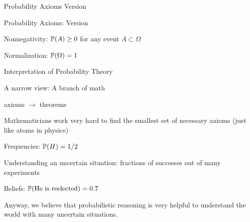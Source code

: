 \begin{frame}{Probability Axioms Version  }

\begin{block}{Probability Axioms: Version  }
\plitemsep 0.1in
\bce[{A}1.] 
\item Nonnegativity: $\mathbb{P}( A ) \geq 0$ for any event $A \subset \Omega$
\item Normalization: $\mathbb{P}( \Omega ) = 1$


\ece
\end{block}


\end{frame}

\begin{frame}{Interpretation of Probability Theory}


\plitemsep 0.1in
\bci
\item<1-> A narrow view: A branch of math

\bci
\item axioms $\rightarrow$ theorems
\item Mathematicians work very hard to find the smallest set of necessary axioms (just like atoms in physics)
\eci



\item<2-> Frequencies: $\mathbb{P}( H ) = 1/2$
\bci
\item Understanding an uncertain situation: fractions of successes out of many experiments

\eci


\item<3-> Beliefs: $\mathbb{P}( \text{He is reelected} ) = 0.7$

\eci

\medskip
Anyway, we believe that probabilistic reasoning is very helpful to understand the world with many uncertain situations.
\end{frame}



